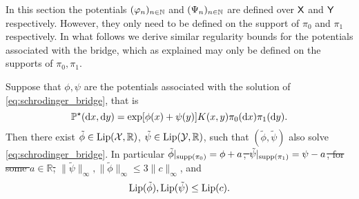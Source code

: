 \documentclass[11pt,a4paper]{article}
\providecommand{\DIFaddtex}[1]{{\protect\color{blue}\uwave{#1}}} %
\providecommand{\DIFdeltex}[1]{{\protect\color{red}\sout{#1}}}                      %
\providecommand{\DIFaddbegin}{} %
\providecommand{\DIFaddend}{} %
\providecommand{\DIFdelbegin}{} %
\providecommand{\DIFdelend}{} %
\providecommand{\DIFadd}[1]{\texorpdfstring{\DIFaddtex{#1}}{#1}} %
\providecommand{\DIFdel}[1]{\texorpdfstring{\DIFdeltex{#1}}{}} %
\begin{document}
In this section the potentials $(\varphi_n)_{n \in \mathbb{N}}$ and
$(\Psi_n)_{n \in \mathbb{N}}$ are defined over $\mathsf{X}$ and $\mathsf{Y}$
respectively. However, they only need to be defined on the support of $\pi_0$
and $\pi_1$ respectively. In what follows we derive similar regularity bounds
for the potentials associated with the \schro bridge, which as explained may only be defined on the supports of $\pi_0, \pi_1$.
\begin{proposition}\label{prop:extensions}
  Suppose that $\phi, \psi$ are the potentials associated with the solution of \eqref{eq:schrodinger_bridge}, that is 
  $$\Pbb^\star(\rmd x, \rmd y) = \exp[\phi(x)+\psi(y)] K(x,y) \DIFdelbegin %
\DIFdelend \pi_0(\DIFaddbegin \rmd \DIFaddend x) \DIFdelbegin %
\DIFdelend \pi_1(\DIFaddbegin \rmd \DIFaddend y).$$
  Then there exist $\tilde{\phi}\in \operatorname{Lip}(\mathcal{X},\mathbb{R})$, $\tilde{\psi}\in \operatorname{Lip}(\mathcal{Y}, \mathbb{R})$, such that
  $(\tilde\phi, \tilde\psi)$ also solve \eqref{eq:schrodinger_bridge}. In particular \DIFdelbegin \DIFdel{$\tilde{\phi}|_{\mathrm{supp}(\pi_0)} = \phi+a$,
  $\tilde{\psi}|_{\mathrm{supp}(\pi_1)} = \psi-a$,  
  for some $a\in \mathbb{R}$,   
  }\DIFdelend \DIFaddbegin \DIFadd{$\tilde{\phi}|_{\supp(\pi_0)} = \phi+c$,
  $\tilde{\psi}|_{\supp(\pi_1)} = \psi-c$,  
  }\DIFaddend $\|\tilde{\psi}\|_\infty, \|\tilde\phi\|_\infty\leq 3 \|c\|_\infty$, and 
  $$\operatorname{Lip}(\tilde{\phi}), \operatorname{Lip}(\tilde{\psi}) \leq \operatorname{Lip}(c).$$
\end{proposition}
\end{document}
